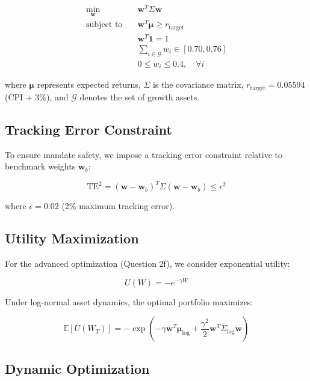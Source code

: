 \documentclass[12pt,a4paper]{article}
\newcommand{\E}{\mathbb{E}}
\begin{document}
\begin{align}
\min_{\mathbf{w}} \quad & \mathbf{w}^T \Sigma \mathbf{w} \\
\text{subject to} \quad & \mathbf{w}^T \boldsymbol{\mu} \geq r_{\text{target}} \\
& \mathbf{w}^T \mathbf{1} = 1 \\
& \sum_{i \in \mathcal{G}} w_i \in [0.70, 0.76] \\
& 0 \leq w_i \leq 0.4, \quad \forall i
\end{align}

where $\boldsymbol{\mu}$ represents expected returns, $\Sigma$ is the covariance matrix, $r_{\text{target}} = 0.05594$ (CPI + 3\%), and $\mathcal{G}$ denotes the set of growth assets.

\subsection{Tracking Error Constraint}

To ensure mandate safety, we impose a tracking error constraint relative to benchmark weights $\mathbf{w}_b$:

\begin{equation}
\text{TE}^2 = (\mathbf{w} - \mathbf{w}_b)^T \Sigma (\mathbf{w} - \mathbf{w}_b) \leq \epsilon^2
\end{equation}

where $\epsilon = 0.02$ (2\% maximum tracking error).

\subsection{Utility Maximization}

For the advanced optimization (Question 2f), we consider exponential utility:

\begin{equation}
U(W) = -e^{-\gamma W}
\end{equation}

Under log-normal asset dynamics, the optimal portfolio maximizes:

\begin{equation}
\E[U(W_T)] = -\exp\left(-\gamma \mathbf{w}^T \boldsymbol{\mu}_{\log} + \frac{\gamma^2}{2} \mathbf{w}^T \Sigma_{\log} \mathbf{w}\right)
\end{equation}

\subsection{Dynamic Optimization}
\end{document}
